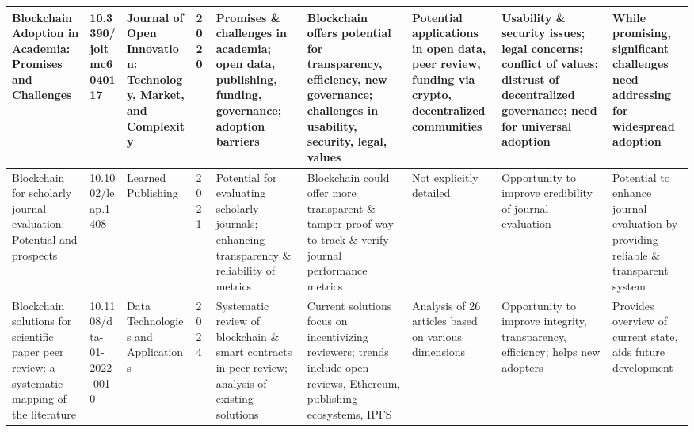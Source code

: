 \documentclass{article}
\begin{document}
\begin{landscape}
\begin{tabularx}{\linewidth}{|p{3.5cm}|p{2.5cm}|p{3cm}|p{1.8cm}|X|X|X|X|X|}
        Blockchain Adoption in Academia: Promises and Challenges                                                                           & 10.3390/joitmc6040117           & Journal of Open Innovation: Technology, Market, and Complexity                & 2020                      & Promises \& challenges in academia; open data, publishing, funding, governance; adoption barriers                           & Blockchain offers potential for transparency, efficiency, new governance; challenges in usability, security, legal, values                     & Potential applications in open data, peer review, funding via crypto, decentralized communities         & Usability \& security issues; legal concerns; conflict of values; distrust of decentralized governance; need for universal adoption & While promising, significant challenges need addressing for widespread adoption                       \\
        \hline

        Blockchain for scholarly journal evaluation: Potential and prospects                                                               & 10.1002/leap.1408               & Learned Publishing                                                            & 2021                      & Potential for evaluating scholarly journals; enhancing transparency \& reliability of metrics                               & Blockchain could offer more transparent \& tamper-proof way to track \& verify journal performance metrics                                     & Not explicitly detailed                                                                                 & Opportunity to improve credibility of journal evaluation                                                                            & Potential to enhance journal evaluation by providing reliable \& transparent system                   \\
        \hline

        Blockchain solutions for scientific paper peer review: a systematic mapping of the literature                                      & 10.1108/dta-01-2022-0010        & Data Technologies and Applications                                            & 2024                      & Systematic review of blockchain \& smart contracts in peer review; analysis of existing solutions                           & Current solutions focus on incentivizing reviewers; trends include open reviews, Ethereum, publishing ecosystems, IPFS                         & Analysis of 26 articles based on various dimensions                                                     & Opportunity to improve integrity, transparency, efficiency; helps new adopters                                                      & Provides overview of current state, aids future development                                           \\
        \hline


\end{tabularx}
\end{landscape}
\end{document}
